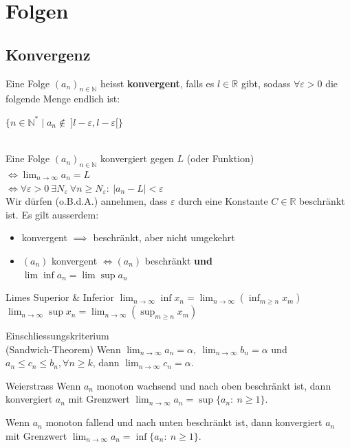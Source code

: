 \documentclass[a4paper,10pt]{article}
\def\limn{\lim_{n\to \infty}}
\def\R{\mathbb{R}}
\begin{document}
\section{Folgen}
\subsection{Konvergenz}
Eine Folge $(a_n)_{n\in \mathbb{N}}$ heisst \textbf{konvergent}, falls es $l \in \mathbb{R}$ gibt, sodass $\forall \varepsilon > 0$ die folgende Menge endlich ist: \\
\centerline{$\{n\in\mathbb{N}^* \mid a_n\notin \ ]l - \varepsilon,l - \varepsilon[\}$ }\\
Eine Folge $(a_n)_{n\in \mathbb{N}}$ konvergiert gegen $L$ (oder Funktion)\\ $\iff \lim_{n \to \infty} a_n = L $ \\ $\iff \forall \varepsilon > 0 \ \exists N_\varepsilon \ \forall n \ge N_\varepsilon : \ | a_n - L | < \varepsilon$\\

Wir dürfen (o.B.d.A.) annehmen, dass $\varepsilon$ durch eine Konstante $C \in \R$ beschränkt ist.
Es gilt ausserdem:
\begin{itemize}
	\item konvergent $\implies$ beschränkt, aber nicht umgekehrt
	\item $(a_n)$ konvergent $\iff (a_n)$ beschränkt \textbf{und} \\$\lim \inf a_n = \lim \sup a_n$
\end{itemize}


\begin{subbox}{Limes Superior \& Inferior}
	$\limn \inf x_n = \limn \left( \inf_{m \ge n} x_m \right)$ \\
	$\limn \sup x_n = \limn \left( \sup_{m \ge n} x_m \right)$
\end{subbox}

\begin{mainbox}{Einschliessungskriterium \\ (Sandwich-Theorem)}
	Wenn $\limn a_n = \alpha, \ \limn b_n = \alpha$ und $a_n \le c_n \le b_n, \forall n \ge k$, dann $\limn c_n = \alpha$.
\end{mainbox}

\begin{mainbox}{Weierstrass}
	Wenn $a_n$ monoton wachsend und nach oben beschränkt ist, dann konvergiert $a_n$ mit Grenzwert $\limn a_n = \sup \{a_n : \ n \ge 1\}$.
	
	Wenn $a_n$ monoton fallend und nach unten beschränkt ist, dann konvergiert $a_n$ mit Grenzwert $\limn a_n = \inf \{a_n : \ n \ge 1\}$.
\end{mainbox}
\end{document}
